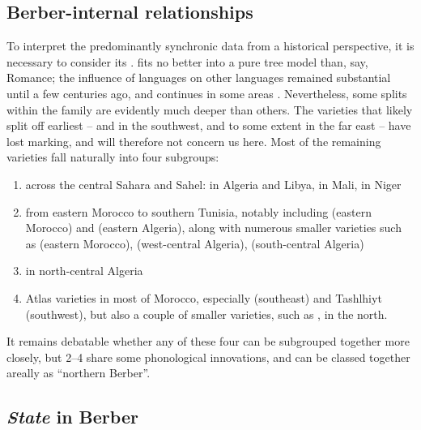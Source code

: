 \documentclass[output=paper,colorlinks,citecolor=brown]{langscibook}
\begin{document}
\subsection{Berber-internal relationships} \label{13sec1.2}

To interpret the predominantly synchronic  data from a historical perspective, it is necessary to consider its .  fits no better into a pure tree model than, say, Romance; the influence of  languages on other  languages remained substantial until a few centuries ago, and continues in some areas \citep{souag2017}. Nevertheless, some splits within the family are evidently much deeper than others. The varieties that likely split off earliest --  and  in the southwest,  and to some extent  in the far east -- have lost  marking, and will therefore not concern us here. Most of the remaining varieties fall naturally into four subgroups:

\begin{enumerate}
	\item
	 across the central Sahara and Sahel:  in Algeria and Libya,  in Mali,  in Niger
	\item
	 from eastern Morocco to southern Tunisia, notably including  (eastern Morocco) and  (eastern Algeria), along with numerous smaller varieties such as  (eastern Morocco),  (west-central Algeria),  (south-central Algeria)
	\item
	 in north-central Algeria
	\item
	Atlas varieties in most of Morocco, especially  (southeast) and Tashlhiyt (southwest), but also a couple of smaller varieties, such as , in the north.
\end{enumerate}

It remains debatable whether any of these four can be subgrouped together more closely, but 2--4 share some phonological innovations, and can be classed together areally as ``northern Berber''.

\subsection{\textit{State} in Berber} \label{13sec1.3}
\end{document}

